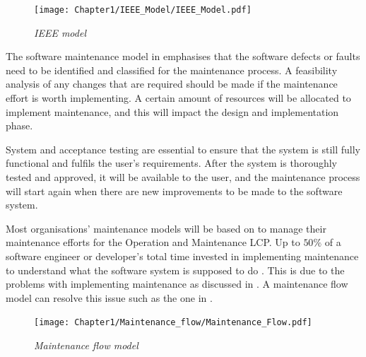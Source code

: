 \begin{figure}[!htb] %
	\centering %
	\texttt{[image: Chapter1/IEEE\_Model/IEEE\_Model.pdf]}
	\caption[IEEE model]
	{\textit{IEEE model \cite{Ren2011}}} \label{fig:ch1_ieeeModel}
\end{figure}

The software maintenance model in  emphasises that the software defects or faults need to be identified and classified for the maintenance process. A feasibility analysis of any changes that are required should be made if the maintenance effort is worth implementing. A certain amount of resources will be allocated to implement maintenance, and this will impact the design and implementation phase.\par System and acceptance testing are essential to ensure that the system is still fully functional and fulfils the user's requirements. After the system is thoroughly tested and approved, it will be available to the user, and the maintenance process will start again when there are new improvements to be made to the software system. \par Most organisations' maintenance models will be based on  to manage their maintenance efforts for the Operation and Maintenance LCP. Up to $50\%$ of a software engineer or developer's total time invested in implementing maintenance to understand what the software system is supposed to do \cite{Tang2010, Zhuo1993}. This is due to the problems with implementing maintenance as discussed in . A maintenance flow model can resolve this issue such as the one in .

\begin{figure}[!htb] %
	\centering %
	\texttt{[image: Chapter1/Maintenance\_flow/Maintenance\_Flow.pdf]}
	\caption[Maintenance flow model]
	{\textit{Maintenance flow model \cite{Tang2010}}} \label{fig:ch1_maintenanceFlow}
\end{figure}

